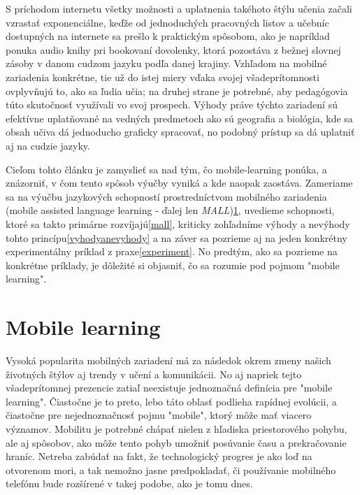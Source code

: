 \documentclass[10pt,oneside,slovak,a4paper]{article}
\begin{document}
S príchodom internetu všetky možnosti a uplatnenia takéhoto štýlu učenia začali vzrastať exponenciálne, keďže od jednoduchých pracovných listov a učebníc dostupných na internete sa prešlo k praktickým spôsobom, ako je napríklad ponuka audio knihy pri bookovaní dovolenky, ktorá pozostáva z bežnej slovnej zásoby v danom cudzom jazyku podľa danej krajiny. Vzhľadom na mobilné zariadenia konkrétne, tie už do istej miery vďaka svojej všadeprítomnosti ovplyvňujú to, ako sa ľudia učia; na druhej strane je potrebné, aby pedagógovia túto skutočnosť využívali vo svoj prospech\cite{KukulskaHulme2009}. Výhody práve týchto zariadení sú efektívne uplatňované na vedných predmetoch ako sú geografia a biológia, kde sa obsah učiva dá jednoducho graficky spracovať, no podobný prístup sa dá uplatniť aj na cudzie jazyky.

Cieľom tohto článku je zamyslieť sa nad tým, čo mobile-learning ponúka, a znázorniť, v čom tento spôsob výučby vyniká a kde naopak zaostáva. Zameriame sa na výučbu jazykových schopností prostredníctvom mobilného zariadenia (mobile assisted language learning - ďalej len \emph{MALL})\ref{ml}, uvedieme schopnosti, ktoré sa takto primárne rozvíjajú\ref{mall}, kriticky zohľadníme výhody a nevýhody tohto princípu\ref{vyhodyanevyhody} a na záver sa pozrieme aj na jeden konkrétny experimentálny príklad z praxe\ref{experiment}. No predtým, ako sa pozrieme na konkrétne príklady, je dôležité si objasniť, čo sa rozumie pod pojmom "mobile learning".


\section{Mobile learning} \label{ml}

Vysoká popularita mobilných zariadení má za následok okrem zmeny našich životných štýlov aj trendy v učení a komunikácii. No aj napriek tejto všadeprítomnej prezencie zatiaľ neexistuje jednoznačná definícia pre "mobile learning"\cite{Kim2012}. Čiastočne je to preto, lebo táto oblasť podlieha rapídnej evolúcii, a čiastočne pre nejednoznačnosť pojmu "mobile", ktorý môže mať viacero významov\cite{KukulskaHulme2009}. Mobilitu je potrebné chápať nielen z hľadiska priestorového pohybu, ale aj spôsobov, ako môže tento pohyb umožniť posúvanie času a prekračovanie hraníc\cite{KukulskaHulme2009}. Netreba zabúdať na fakt, že technologický progres je ako loď na otvorenom mori, a tak nemožno jasne predpokladať, či používanie mobilného telefónu bude rozšírené v takej podobe, ako je tomu dnes. 
\end{document}
